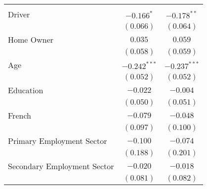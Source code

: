 \begin{center}
\begin{tiny}
\begin{longtable}{l@{} c@{} c@{}}
                                                                                                       &                  &                  \\
\quad Driver                                                                                           & $-0.166^{*}$     & $-0.178^{**}$    \\
                                                                                                       & $(0.066)$        & $(0.064)$        \\
\quad Home Owner                                                                                       & $0.035$          & $0.059$          \\
                                                                                                       & $(0.058)$        & $(0.059)$        \\
\quad Age                                                                                              & $-0.242^{***}$   & $-0.237^{***}$   \\
                                                                                                       & $(0.052)$        & $(0.052)$        \\
\quad Education                                                                                        & $-0.022$         & $-0.004$         \\
                                                                                                       & $(0.050)$        & $(0.051)$        \\
\quad French                                                                                           & $-0.079$         & $-0.048$         \\
                                                                                                       & $(0.097)$        & $(0.100)$        \\
\quad Primary Employment Sector                                                                        & $-0.100$         & $-0.074$         \\
                                                                                                       & $(0.188)$        & $(0.201)$        \\
\quad Secondary Employment Sector                                                                      & $-0.020$         & $-0.018$         \\
                                                                                                       & $(0.081)$        & $(0.082)$        \\

\end{longtable}
\end{tiny}
\end{center}
